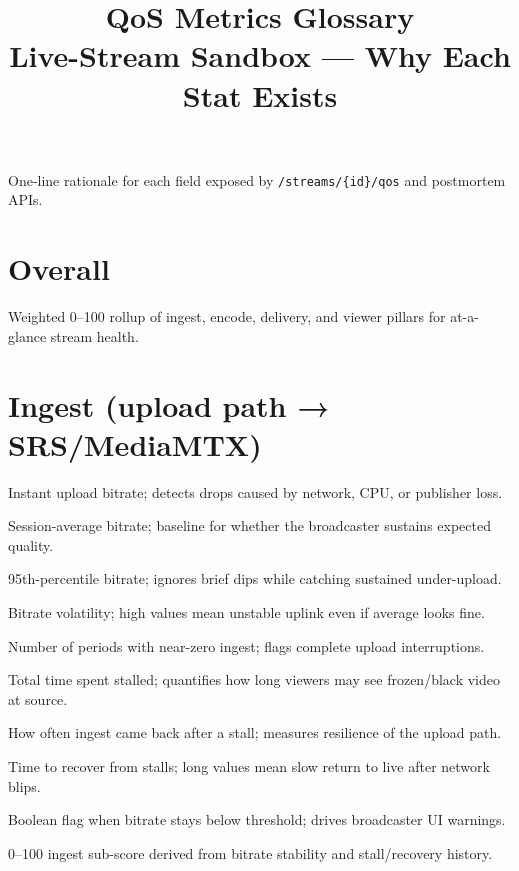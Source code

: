 \documentclass[10pt,a4paper]{article}
\title{\textbf{QoS Metrics Glossary}\\[0.2em]\large Live-Stream Sandbox --- Why Each Stat Exists}
\author{}
\date{}
\newcommand{\metric}[2]{\item[\texttt{#1}] #2}
\begin{document}
\maketitle
\noindent One-line rationale for each field exposed by \texttt{/streams/\{id\}/qos} and postmortem APIs.

\section*{Overall}
\begin{description}[style=nextline, leftmargin=2.6cm, labelwidth=2.4cm]
  \metric{overallHealthScore}{Weighted 0--100 rollup of ingest, encode, delivery, and viewer pillars for at-a-glance stream health.}
\end{description}

\section*{Ingest (upload path → SRS/MediaMTX)}
\begin{description}[style=nextline, leftmargin=2.6cm, labelwidth=2.4cm]
  \metric{currentIngestKbps}{Instant upload bitrate; detects drops caused by network, CPU, or publisher loss.}
  \metric{ingestKbpsAvg}{Session-average bitrate; baseline for whether the broadcaster sustains expected quality.}
  \metric{ingestKbpsP95}{95th-percentile bitrate; ignores brief dips while catching sustained under-upload.}
  \metric{ingestKbpsStdDev}{Bitrate volatility; high values mean unstable uplink even if average looks fine.}
  \metric{ingestStallCount}{Number of periods with near-zero ingest; flags complete upload interruptions.}
  \metric{ingestStallTotalMs}{Total time spent stalled; quantifies how long viewers may see frozen/black video at source.}
  \metric{ingestRecoveryCount}{How often ingest came back after a stall; measures resilience of the upload path.}
  \metric{ingestRecoveryTotalMs}{Time to recover from stalls; long values mean slow return to live after network blips.}
  \metric{ingestUnstable}{Boolean flag when bitrate stays below threshold; drives broadcaster UI warnings.}
  \metric{ingestHealthScore}{0--100 ingest sub-score derived from bitrate stability and stall/recovery history.}
\end{description}
\end{document}
